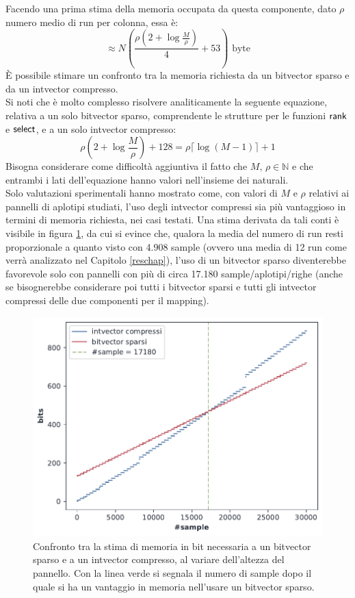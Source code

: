 Facendo una prima stima della memoria occupata da questa componente,
dato $\rho$ numero medio di run per colonna, essa è:
\begin{equation}
  \label{eq:mapintmem2}
  \approx N\left(\frac{\rho\left(2+\log\frac{M}{\rho}\right)}{4}+
    53\right)\mbox{ byte} 
\end{equation}
È possibile stimare un confronto tra la memoria
richiesta da un bitvector sparso e da un intvector compresso.\\
Si noti che è molto complesso risolvere analiticamente la seguente equazione,
relativa a un solo bitvector sparso, comprendente le strutture per
le funzioni $\mbox{\rm {\sf rank}}$ e $\mbox{\rm {\sf select}}$, e a un solo intvector
compresso: 
\begin{equation}
  \label{eq:mapbvintmem}
  \rho\left(2+\log\frac{M}{\rho}\right)+128=\rho\lceil\log(M-1)\rceil+1
\end{equation}
Bisogna considerare come difficoltà aggiuntiva il fatto che $M,\,\rho\in
\mathbb{N}$ e che entrambi i lati dell'equazione hanno valori nell'insieme dei
naturali.\\
Solo valutazioni sperimentali hanno mostrato come, con valori di $M$ e $\rho$
relativi ai pannelli di aplotipi studiati, l'uso degli intvector compressi sia
più vantaggioso in termini di memoria richiesta, nei casi testati. Una stima
derivata da tali 
conti è visibile in figura \ref{fig:bvvsint}, da cui si evince che, qualora la
media del numero di run resti proporzionale a quanto visto con 4.908 sample
(ovvero una media di 12 run come verrà
analizzato nel Capitolo \ref{reschap}), l'uso di un
bitvector sparso diventerebbe favorevole solo con pannelli con più di circa
17.180 sample/aplotipi/righe (anche se bisognerebbe considerare poi tutti i
bitvector sparsi e tutti gli intvector compressi delle due componenti per il
mapping).  
\begin{figure}
  \centering
  \includegraphics[scale = 0.7]{img/bv_vs_iv.pdf}
  \caption{Confronto tra la stima di memoria in bit necessaria a un bitvector
    sparso e a un 
    intvector compresso, al variare dell'altezza del pannello. Con la linea
    verde si segnala il numero di sample dopo il quale si ha un vantaggio
    in memoria nell'usare un bitvector sparso.}
  \label{fig:bvvsint}
\end{figure}